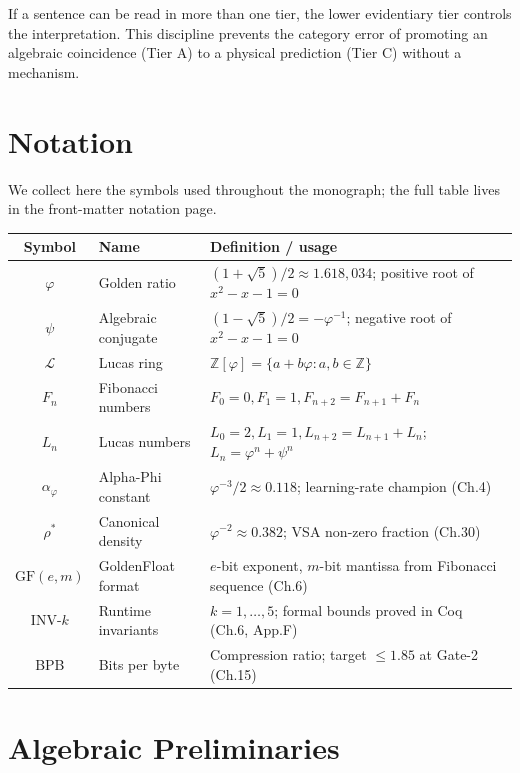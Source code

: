 If a sentence can be read in more than one tier, the lower evidentiary tier controls the interpretation. This discipline prevents the category error of promoting an algebraic coincidence (Tier A) to a physical prediction (Tier C) without a mechanism.

\section{Notation}

We collect here the symbols used throughout the monograph; the full
table lives in the front-matter notation page.

\begin{longtable}[]{@{}clp{8cm}@{}}
\toprule\noalign{}
Symbol & Name & Definition / usage \\
\midrule\noalign{}
\endhead
\bottomrule\noalign{}
\endlastfoot
\(\varphi\) & Golden ratio & \((1+\sqrt{5})/2 \approx 1.618{,}034\); positive root of \(x^2 - x - 1 = 0\) \\
\(\psi\) & Algebraic conjugate & \((1-\sqrt{5})/2 = -\varphi^{-1}\); negative root of \(x^2 - x - 1 = 0\) \\
\(\mathcal{L}\) & Lucas ring & \(\mathbb{Z}[\varphi] = \{a + b\varphi : a, b \in \mathbb{Z}\}\) \\
\(F_n\) & Fibonacci numbers & \(F_0=0, F_1=1, F_{n+2}=F_{n+1}+F_n\) \\
\(L_n\) & Lucas numbers & \(L_0=2, L_1=1, L_{n+2}=L_{n+1}+L_n\); \(L_n = \varphi^n + \psi^n\) \\
\(\alpha_\varphi\) & Alpha-Phi constant & \(\varphi^{-3}/2 \approx 0.118\); learning-rate champion (Ch.4) \\
\(\rho^*\) & Canonical density & \(\varphi^{-2} \approx 0.382\); VSA non-zero fraction (Ch.30) \\
\(\mathrm{GF}(e,m)\) & GoldenFloat format & \(e\)-bit exponent, \(m\)-bit mantissa from Fibonacci sequence (Ch.6) \\
\(\text{INV-}k\) & Runtime invariants & \(k = 1, \ldots, 5\); formal bounds proved in Coq (Ch.6, App.F) \\
BPB & Bits per byte & Compression ratio; target \(\leq 1.85\) at Gate-2 (Ch.15) \\
\end{longtable}

\section{Algebraic Preliminaries}

